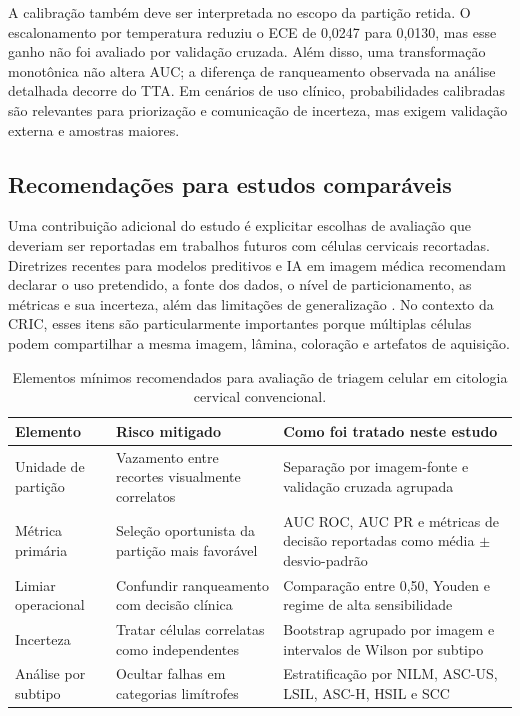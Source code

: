 A calibração também deve ser interpretada no escopo da partição retida. O
escalonamento por temperatura reduziu o ECE de 0,0247 para 0,0130, mas esse
ganho não foi avaliado por validação cruzada. Além disso, uma transformação
monotônica não altera AUC; a diferença de ranqueamento observada na análise
detalhada decorre do TTA. Em cenários de uso clínico, probabilidades calibradas
são relevantes para priorização e comunicação de incerteza, mas exigem
validação externa e amostras maiores.

\subsection{Recomendações para estudos comparáveis}

Uma contribuição adicional do estudo é explicitar escolhas de avaliação que
deveriam ser reportadas em trabalhos futuros com células cervicais recortadas.
Diretrizes recentes para modelos preditivos e IA em imagem médica recomendam
declarar o uso pretendido, a fonte dos dados, o nível de particionamento, as
métricas e sua incerteza, além das limitações de generalização
\cite{collins2024tripod,tejani2024claim}. No contexto da CRIC, esses itens são
particularmente importantes porque múltiplas células podem compartilhar a mesma
imagem, lâmina, coloração e artefatos de aquisição.

\begin{table}[ht]
\centering
\caption{Elementos mínimos recomendados para avaliação de triagem celular em
citologia cervical convencional.}
\label{tab:recomendacoes}
\scriptsize
\renewcommand{\arraystretch}{0.92}
\setlength{\tabcolsep}{3pt}
\begin{tabular}{p{3.1cm}p{4.25cm}p{4.35cm}}
\toprule
Elemento & Risco mitigado & Como foi tratado neste estudo \\
\midrule
Unidade de partição & Vazamento entre recortes visualmente correlatos &
Separação por imagem-fonte e validação cruzada agrupada \\
Métrica primária & Seleção oportunista da partição mais favorável & AUC ROC,
AUC PR e métricas de decisão reportadas como média $\pm$ desvio-padrão \\
Limiar operacional & Confundir ranqueamento com decisão clínica & Comparação
entre 0,50, Youden e regime de alta sensibilidade \\
Incerteza & Tratar células correlatas como independentes & Bootstrap agrupado
por imagem e intervalos de Wilson por subtipo \\
Análise por subtipo & Ocultar falhas em categorias limítrofes & Estratificação
por NILM, ASC-US, LSIL, ASC-H, HSIL e SCC \\
\bottomrule
\end{tabular}
\renewcommand{\arraystretch}{1.0}
\end{table}

